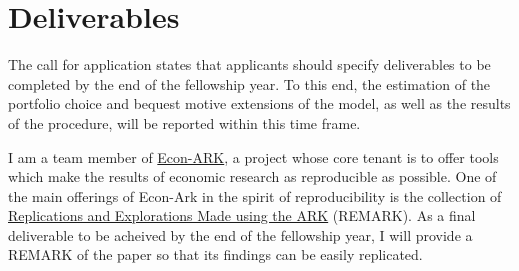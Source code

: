 \documentclass[\econtexRoot/Chp1proposal]{subfiles}
\begin{document}
\hypertarget{deliverables}{}
\section{Deliverables}\notinsubfile{\label{sec:deliverables}}

\par The call for application states that applicants should specify deliverables to be completed by the end of the fellowship year. To this end, the estimation of the portfolio choice and bequest motive extensions of the model, as well as the results of the procedure, will be reported within this time frame.

\par I am a team member of \href{https://econ-ark.org}{Econ-ARK}, a project whose core tenant is to offer tools which make the results of economic research as reproducible as possible. One of the main offerings of Econ-Ark in the spirit of reproducibility is the collection of \href{https://github.com/econ-ark/REMARK}{Replications and Explorations Made using the ARK} (REMARK). As a final deliverable to be acheived by the end of the fellowship year, I will provide a REMARK of the paper so that its findings can be easily replicated.  

\onlyinsubfile{}

\end{document}
